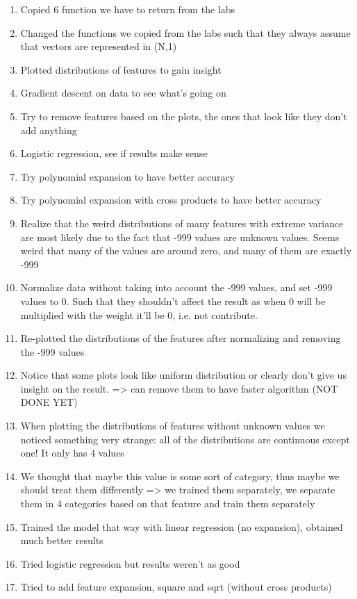\documentclass[10pt,conference,compsocconf]{IEEEtran}
\begin{document}
\begin{enumerate}
	\item{Copied 6 function we have to return from the labs}
	\item{Changed the functions we copied from the labs such that they always assume that vectors are represented in (N,1)}
	\item{Plotted distributions of features to gain insight}
	\item{Gradient descent on data to see what's going on}
	\item{Try to remove features based on the plots, the ones that look like they don't add anything}
	\item{Logistic regression, see if results make sense}
	\item{Try polynomial expansion to have better accuracy}
	\item{Try polynomial expansion with cross products to have better accuracy}
	\item{Realize that the weird distributions of many features with extreme variance are most likely due to the fact that -999 values are unknown values. Seems weird that many of the values are around zero, and many of them are exactly -999}
	\item{Normalize data without taking into account the -999 values, and set -999 values to 0. Such that they shouldn't affect the result as when 0 will be multiplied with the weight it'll be 0, i.e. not contribute.}
	\item{Re-plotted the distributions of the features after normalizing and removing the -999 values}
	\item{Notice that some plots look like uniform distribution or clearly don't give us insight on the result. => can remove them to have faster algorithm (NOT DONE YET)}
	\item{When plotting the distributions of features without unknown values we noticed something very strange: all of the distributions are continuous except one! It only has 4 values}
	\item{We thought that maybe this value is some sort of category, thus maybe we should treat them differently => we trained them separately, we separate them in 4 categories based on that feature and train them separately}
	\item{Trained the model that way with linear regression (no expansion), obtained much better results}
	\item{Tried logistic regression but results weren't as good}
	\item{Tried to add feature expansion, square and sqrt (without cross products)}
\end{enumerate}
\end{document}
